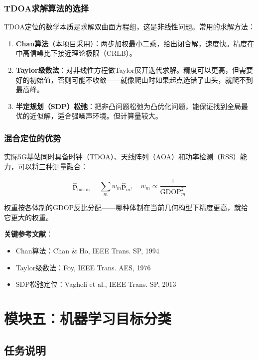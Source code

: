 \documentclass[12pt, a4paper]{article}
\newcommand{\mat}[1]{\boldsymbol{#1}}
\begin{document}
\subsubsection{TDOA求解算法的选择}

TDOA定位的数学本质是求解双曲面方程组，这是非线性问题。常用的求解方法：

\begin{enumerate}
  \item \textbf{Chan算法}（本项目采用）：两步加权最小二乘，给出闭合解，速度快。精度在中高信噪比下接近理论极限（CRLB）。
  \item \textbf{Taylor级数法}：对非线性方程做Taylor展开迭代求解。精度可以更高，但需要好的初始值，否则可能不收敛——就像爬山时如果起点选错了山头，就爬不到最高峰。
  \item \textbf{半定规划（SDP）松弛}：把非凸问题松弛为凸优化问题，能保证找到全局最优的近似解，适合强噪声环境。但计算量较大。
\end{enumerate}

\subsubsection{混合定位的优势}

实际5G基站同时具备时钟（TDOA）、天线阵列（AOA）和功率检测（RSS）能力，可以将三种测量融合：

\begin{equation}
\hat{\mat{p}}_\text{fusion} = \sum_{m} w_m \hat{\mat{p}}_m, \quad w_m \propto \frac{1}{\text{GDOP}_m^2}
\end{equation}

权重按各体制的GDOP反比分配——哪种体制在当前几何构型下精度更高，就给它更大的权重。

\textbf{关键参考文献}：
\begin{itemize}
  \item Chan算法：Chan \& Ho, IEEE Trans. SP, 1994
  \item Taylor级数法：Foy, IEEE Trans. AES, 1976
  \item SDP松弛定位：Vaghefi et al., IEEE Trans. SP, 2013
\end{itemize}

\section{模块五：机器学习目标分类}

\subsection{任务说明}
\end{document}
